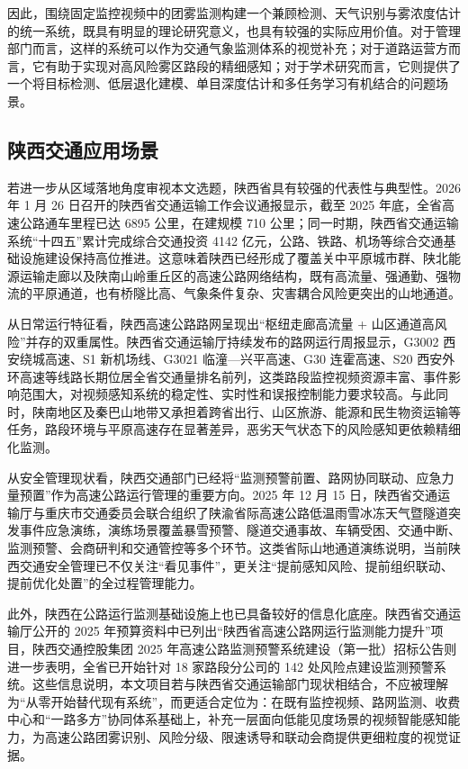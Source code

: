 因此，围绕固定监控视频中的团雾监测构建一个兼顾检测、天气识别与雾浓度估计的统一系统，既具有明显的理论研究意义，也具有较强的实际应用价值。对于管理部门而言，这样的系统可以作为交通气象监测体系的视觉补充；对于道路运营方而言，它有助于实现对高风险雾区路段的精细感知；对于学术研究而言，它则提供了一个将目标检测、低层退化建模、单目深度估计和多任务学习有机结合的问题场景。

\subsection{陕西交通应用场景}

若进一步从区域落地角度审视本文选题，陕西省具有较强的代表性与典型性。2026 年 1 月 26 日召开的陕西省交通运输工作会议通报显示，截至 2025 年底，全省高速公路通车里程已达 6895 公里，在建规模 710 公里；同一时期，陕西省交通运输系统“十四五”累计完成综合交通投资 4142 亿元，公路、铁路、机场等综合交通基础设施建设保持高位推进\cite{shaanxiMeeting2026,shaanxiHighwayMeeting2026}。这意味着陕西已经形成了覆盖关中平原城市群、陕北能源运输走廊以及陕南山岭重丘区的高速公路网络结构，既有高流量、强通勤、强物流的平原通道，也有桥隧比高、气象条件复杂、灾害耦合风险更突出的山地通道。

从日常运行特征看，陕西高速公路路网呈现出“枢纽走廊高流量 + 山区通道高风险”并存的双重属性。陕西省交通运输厅持续发布的路网运行周报显示，G3002 西安绕城高速、S1 新机场线、G3021 临潼—兴平高速、G30 连霍高速、S20 西安外环高速等线路长期位居全省交通量排名前列，这类路段监控视频资源丰富、事件影响范围大，对视频感知系统的稳定性、实时性和误报控制能力要求较高\cite{shaanxiWeekly2025,shaanxiWeekly2026,shaanxiWhitepaper2024}。与此同时，陕南地区及秦巴山地带又承担着跨省出行、山区旅游、能源和民生物资运输等任务，路段环境与平原高速存在显著差异，恶劣天气状态下的风险感知更依赖精细化监测。

从安全管理现状看，陕西交通部门已经将“监测预警前置、路网协同联动、应急力量预置”作为高速公路运行管理的重要方向。2025 年 12 月 15 日，陕西省交通运输厅与重庆市交通委员会联合组织了陕渝省际高速公路低温雨雪冰冻天气暨隧道突发事件应急演练，演练场景覆盖暴雪预警、隧道交通事故、车辆受困、交通中断、监测预警、会商研判和交通管控等多个环节\cite{shaanxiEmergency2025}。这类省际山地通道演练说明，当前陕西交通安全管理已不仅关注“看见事件”，更关注“提前感知风险、提前组织联动、提前优化处置”的全过程管理能力。

此外，陕西在公路运行监测基础设施上也已具备较好的信息化底座。陕西省交通运输厅公开的 2025 年预算资料中已列出“陕西省高速公路网运行监测能力提升”项目，陕西交通控股集团 2025 年高速公路监测预警系统建设（第一批）招标公告则进一步表明，全省已开始针对 18 家路段分公司的 142 处风险点建设监测预警系统\cite{shaanxiBudget2025,shaanxiRiskProject2025}。这些信息说明，本文项目若与陕西省交通运输部门现状相结合，不应被理解为“从零开始替代现有系统”，而更适合定位为：在既有监控视频、路网监测、收费中心和“一路多方”协同体系基础上，补充一层面向低能见度场景的视频智能感知能力，为高速公路团雾识别、风险分级、限速诱导和联动会商提供更细粒度的视觉证据。

